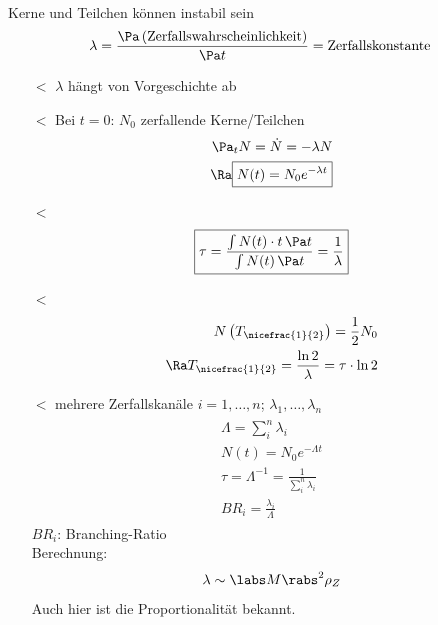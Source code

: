 \\
Kerne und Teilchen können instabil sein
\begin{align}
\lambda = \frac{\Pa \left(\text{Zerfallswahrscheinlichkeit}\right)}{\Pa t} = \text{Zerfallskonstante}
\end{align}
\begin{itemize}
\item[$\lt$] $\lambda$ hängt  von Vorgeschichte ab
\item[$\lt$] Bei $t=0$: $N_0$ zerfallende Kerne/Teilchen
\begin{align}
\begin{split}
\Pa_t N = \dot{N} = -\lambda N\\
\Ra \boxed{ N(t) = N_0 e^{-\lambda t} }
\end{split}
\end{align}
\item[$\lt$] 
\begin{align}
\boxed{\tau = \frac{\int N(t) \cdot t \,\Pa t}{\int N(t) \, \Pa t} = \frac{1}{\lambda}}
\end{align}
\item[$\lt$] 
\begin{align}
\begin{split}
N\left(T_{\nicefrac{1}{2}}\right) = \frac{1}{2}N_0\\
\Ra T_{\nicefrac{1}{2}} = \frac{\ln 2}{\lambda} = \tau \cdot \ln 2
\end{split}
\end{align}
\item[$\lt$] mehrere Zerfallskanäle $i = 1, \dots, n$; $\lambda_1,\dots,\lambda_n$
\begin{align}
\begin{split}
\Lambda = \sum_i^n \lambda_i\\
N(t) = N_0 e^{-\Lambda t}\\
\tau = \Lambda^{-1} = \frac{1}{\sum_i^n \lambda_i}\\
BR_i = \frac{\lambda_i}{\Lambda}
\end{split}
\end{align}
$BR_i$: Branching-Ratio\\
Berechnung:
\begin{align}
\lambda \sim \labs M\rabs^2 \rho_Z
\end{align}
Auch hier ist die Proportionalität bekannt.
\end{itemize}
